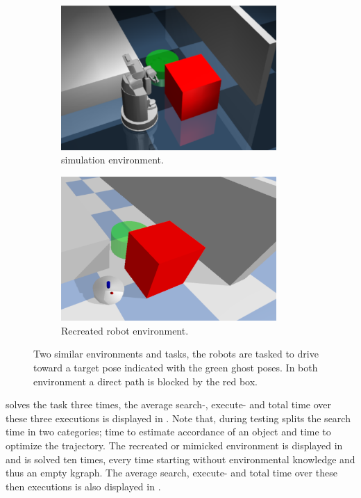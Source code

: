 \begin{figure}[H]
    \centering
    \begin{subfigure}{.49\textwidth}
    \centering
    \includegraphics[width=0.9\textwidth]{figures/results/wang_env}
    \caption{\citeauthor{wang_affordancebased_2020} simulation environment.}%
    \label{subfig:wang_env}
    \end{subfigure}
    \hfill
    \begin{subfigure}{.49\textwidth}
    \centering
    \includegraphics[width=0.9\textwidth]{figures/results/wang_mimick}
    \caption{Recreated robot environment.}%
    \label{subfig:wang_mimick}
    \end{subfigure}
    \caption{Two similar environments and tasks, the robots are tasked to drive toward a target pose indicated with the green ghost poses. In both environment a direct path is blocked by the red box.}%
    \label{fig:wang}
\end{figure}

\citeauthor{wang_affordancebased_2020} solves the task three times, the average search-, execute- and total time over these three executions is displayed in . Note that, during testing \citeauthor{wang_affordancebased_2020} splits the search time in two categories; time to estimate accordance of an object and time to optimize the trajectory. The recreated or mimicked environment is displayed in  and is solved ten times, every time starting without environmental knowledge and thus an empty \ac{kgraph}. The average search, execute- and total time over these then executions is also displayed in .\bs

